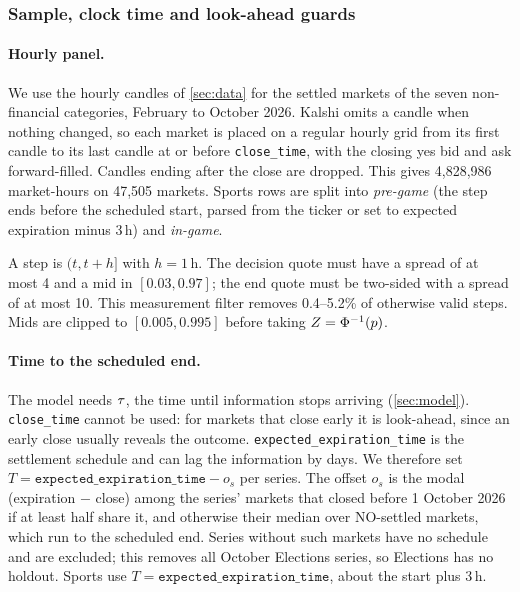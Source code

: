 
\subsubsection{Sample, clock time and look-ahead guards}\label{sec:dyn-sample}

\paragraph{Hourly panel.}
We use the hourly candles of \cref{sec:data} for the settled markets of the seven non-financial
categories, February to October 2026. Kalshi omits a candle when nothing changed, so each market
is placed on a regular hourly grid from its first candle to its last candle at or before
\texttt{close\_time}, with the closing yes bid and ask forward-filled. Candles ending after the
close are dropped. This gives 4{,}828{,}986 market-hours on 47{,}505 markets.
Sports rows are split into \emph{pre-game} (the step ends before the scheduled start, parsed from the
ticker or set to expected expiration minus 3\,h) and \emph{in-game}.

A step is $(t,t+h]$ with $h=1$\,h. The decision quote must have a spread of at most 4\cents{} and a
mid in $[0.03,0.97]$; the end quote must be two-sided with a spread of at most 10\cents. This
measurement filter removes 0.4--5.2\% of otherwise valid steps.
Mids are clipped to $[0.005,0.995]$ before taking $Z=\Phi^{-1}(p)$.

\paragraph{Time to the scheduled end.}
The model needs $\tau$, the time until information stops arriving (\cref{sec:model}).
\texttt{close\_time} cannot be used: for markets that close early it is look-ahead, since an early
close usually reveals the outcome. \texttt{expected\_expiration\_time} is the settlement schedule
and can lag the information by days. We therefore set $T=\texttt{expected\_expiration\_time}-o_s$
per series. The offset $o_s$ is the modal (expiration $-$ close) among the series' markets that
closed before 1 October 2026 if at least half share it, and otherwise their median over NO-settled
markets, which run to the scheduled end. Series without such markets have no schedule and are
excluded; this removes all October Elections series, so Elections has no holdout. Sports use
$T=\texttt{expected\_expiration\_time}$, about the start plus 3\,h.

